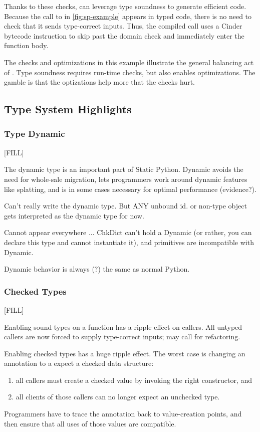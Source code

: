 \documentclass[a4paper,english,cleveref,autoref,thm-restate,anonymous,]{lipics-v2021}
\begin{document}
Thanks to these checks, \SP{} can leverage type soundness to generate efficient code.
Because the call to  in \cref{fig:sp-example} appears in typed code,
there is no need to check that it sends type-correct inputs.
Thus, the compiled call uses a Cinder bytecode instruction to skip past the
domain check and immediately enter the function body.

The checks and optimizations in this example illustrate the general balancing act
of \SP{}.
Type soundness requires run-time checks, but also enables optimizations.
The gamble is that the optizations help more that the checks hurt.


\subsection{Type System Highlights}

\subsubsection{Type Dynamic}

[FILL]

The dynamic type is an important part of Static Python.
Dynamic avoids the need for whole-sale migration,
lets programmers work around dynamic features like splatting,
and is in some cases necessary for optimal performance (evidence?).

Can't really write the dynamic type.
But ANY unbound id. or non-type object gets interpreted as the dynamic type for now.

Cannot appear everywhere ... ChkDict can't hold a Dynamic (or rather, you can declare this type and cannot instantiate it),
and primitives are incompatible with Dynamic. 

Dynamic behavior is always (?) the same as normal Python.


\subsubsection{Checked Types}

[FILL]

Enabling sound types on a function has a ripple effect on callers.
All untyped callers are now forced to supply type-correct inputs; may call for
refactoring.

Enabling checked types has a huge ripple effect.
The worst case is changing an annotation to a expect a checked data structure:
\begin{enumerate}
  \item all callers must create a checked value by invoking the right constructor, and
  \item all clients of those callers can no longer expect an unchecked type.
\end{enumerate}
Programmers have to trace the annotation back to value-creation points, and then
ensure that all uses of those values are compatible.
\end{document}
